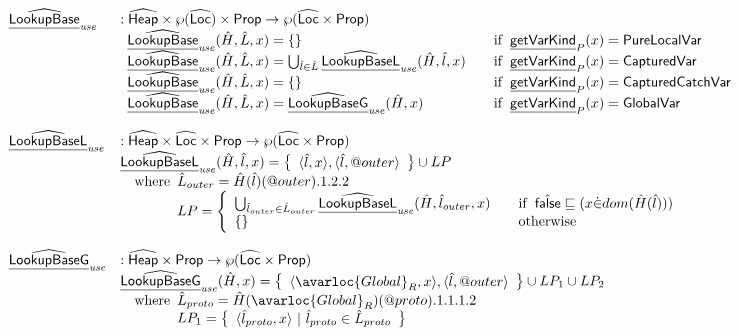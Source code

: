 \[
\begin{array}{ll}
\ahf{LookupBase}_{\it use} & : \aHeap \times \powerset{\aLoc} \times \SF{Prop} \rightarrow \powerset{\aLoc \times \SF{Prop}}\\
& 
\begin{array}{ll}
  \ahf{LookupBase}_{\it use}(\hat{H},\hat{L},x) = \set{}&\quad\ifc{\chf{getVarKind}_P(x)=\SF{PureLocalVar}}\\
  \ahf{LookupBase}_{\it use}(\hat{H},\hat{L},x) = \bigcup_{\hat{l}\in\hat{L}}\ahf{LookupBaseL}_{\it use}(\hat{H},\hat{l},x)&\quad\ifc{\chf{getVarKind}_P(x)=\SF{CapturedVar}}\\
  \ahf{LookupBase}_{\it use}(\hat{H},\hat{L},x) = \set{}&\quad\ifc{\chf{getVarKind}_P(x)=\SF{CapturedCatchVar}}\\
  \ahf{LookupBase}_{\it use}(\hat{H},\hat{L},x) = \ahf{LookupBaseG}_{\it use}(\hat{H},x)&\quad\ifc{\chf{getVarKind}_P(x)=\SF{GlobalVar}}
\end{array}
\\\\
\ahf{LookupBaseL}_{\it use} & : \aHeap \times \aLoc \times \SF{Prop} \rightarrow \powerset{\aLoc \times \SF{Prop}}\\
& \ahf{LookupBaseL}_{\it use}(\hat{H},\hat{l},x) = \set{\langle\hat{l}, x\rangle,\langle\hat{l}, \varprop{outer}\rangle}\cup LP\\
& \quad\wherec{
  \hat{L}_{outer} = \hat{H}(\hat{l})(\varprop{outer}).1.2.2\\
  LP = \left\{
    \begin{array}{ll}
      \bigcup_{\hat{l}_{outer}\in\hat{L}_{outer}}\ahf{LookupBaseL}_{\it use}(\hat{H},\hat{l}_{outer},x) & \quad\ifc{\afalse\sqsubseteq (x\dot{\in}dom(\hat{H}(\hat{l})))}\\
      \set{}&\quad\owc
    \end{array}
  \right.\\
}
\\\\
\ahf{LookupBaseG}_{\it use} & : \aHeap \times \SF{Prop} \rightarrow \powerset{\aLoc \times \SF{Prop}}\\
& \ahf{LookupBaseG}_{\it use}(\hat{H},x) = \set{\langle\avarloc{Global}_R, x\rangle,\langle\hat{l}, \varprop{outer}\rangle}\cup LP_1 \cup LP_2\\
& \quad\wherec{
  \hat{L}_{proto} = \hat{H}(\avarloc{Global}_R)(\varprop{proto}).1.1.1.2\\
  LP_1 = \set{\langle \hat{l}_{proto},x\rangle ~|~ \hat{l}_{proto}\in\hat{L}_{proto}}\\
}
\end{array}\]
